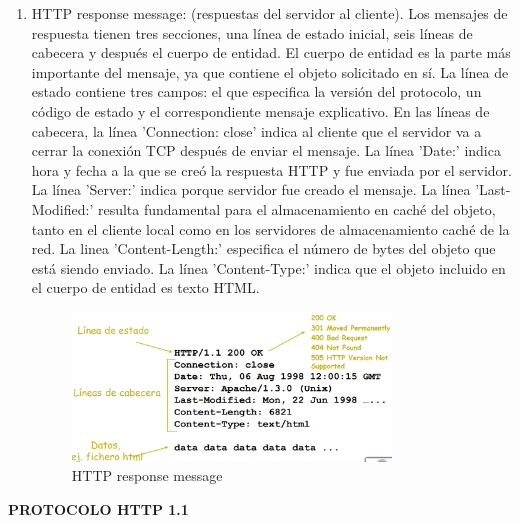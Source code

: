 \documentclass[a4paper,11pt]{article}
\begin{document}
\begin{enumerate}
\item HTTP response message: (respuestas del servidor al cliente). Los mensajes de respuesta tienen tres secciones, una línea de estado inicial, seis líneas de cabecera y después el cuerpo de entidad. El cuerpo de entidad es la parte más importante del mensaje, ya que contiene el objeto solicitado en sí. La línea de estado contiene tres campos: el que especifica la versión del protocolo, un código de estado y el correspondiente mensaje explicativo. En las líneas de cabecera, la línea 'Connection: close' indica al cliente que el servidor va a cerrar la conexión TCP después de enviar el mensaje. La línea 'Date:' indica hora y fecha a la que se creó la respuesta HTTP y fue enviada por el servidor. La línea 'Server:' indica porque servidor fue creado el mensaje. La línea 'Last-Modified:' resulta fundamental para el almacenamiento en caché del objeto, tanto en el cliente local como en los servidores de almacenamiento caché de la red. La linea 'Content-Length:' especifica el número de bytes del objeto que está siendo enviado. La línea 'Content-Type:' indica que el objeto incluido en el cuerpo de entidad es texto HTML.
	\begin{figure}[h]
		\centering
		\caption{HTTP response message}
		\includegraphics[scale=1,width=0.8\textwidth]{mensaje_respuesta.png}
	\end{figure}
\end{enumerate}

\textbf{PROTOCOLO HTTP 1.1}
\end{document}
